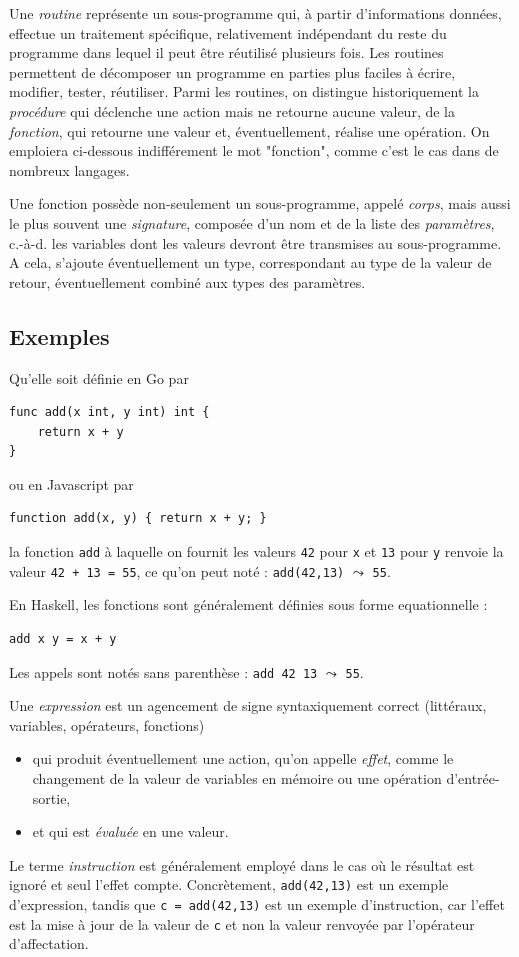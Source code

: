 \documentclass[a4paper,francais]{insalyon}
\newcommand{\cad}{c.-à-d.}
\begin{document}
Une \emph{routine} représente un sous-programme qui, à partir d'informations données, effectue un traitement spécifique, relativement indépendant du reste du programme dans lequel il peut être réutilisé plusieurs fois. Les routines permettent de décomposer un programme en parties plus faciles à écrire, modifier, tester, réutiliser. Parmi les routines, on distingue historiquement la \emph{procédure} qui déclenche une action mais ne retourne aucune valeur, de la \emph{fonction}, qui retourne une valeur et, éventuellement, réalise une opération. On emploiera ci-dessous indifférement le mot "fonction", comme c'est le cas dans de nombreux langages.    

Une fonction possède non-seulement un sous-programme, appelé \emph{corps}, mais aussi le plus souvent une \emph{signature}, composée d'un nom et de la liste des \emph{paramètres}, {\cad} les variables dont les valeurs devront être transmises au sous-programme. A cela, s'ajoute éventuellement un type, correspondant au type de la valeur de retour, éventuellement combiné aux types des paramètres.

\subsection{Exemples}

Qu'elle soit définie en Go par 
\begin{verbatim}
func add(x int, y int) int {
	return x + y
}
\end{verbatim}
ou en Javascript par  
\begin{verbatim}
function add(x, y) { return x + y; }
\end{verbatim}
la fonction \texttt{add} à laquelle on fournit les valeurs \texttt{42} pour \texttt{x} et \texttt{13} pour \texttt{y} renvoie la valeur \verb!42 + 13 = 55!, ce qu'on peut noté : \verb!add(42,13)! $\leadsto$ \texttt{55}.

En Haskell, les fonctions sont généralement définies sous forme equationnelle :  
\begin{verbatim}
add x y = x + y
\end{verbatim}

Les appels sont notés sans parenthèse : \verb!add 42 13! $\leadsto$ \texttt{55}. 

Une \emph{expression} est un agencement de signe syntaxiquement correct (littéraux, variables, opérateurs, fonctions)
\begin{itemize}
\item qui produit éventuellement une action, qu'on appelle \emph{effet}, comme le changement de la valeur de variables en mémoire ou une opération d'entrée-sortie, 
\item et qui est \emph{évaluée} en une valeur. 
\end{itemize}
Le terme \emph{instruction} est généralement employé dans le cas où le résultat est ignoré et seul l'effet compte. Concrètement, \verb!add(42,13)! est un exemple d'expression, tandis que \verb!c = add(42,13)! est un exemple d'instruction, car l'effet est la mise à jour de la valeur de \texttt{c} et non la valeur renvoyée par l'opérateur d'affectation. 
\end{document}
